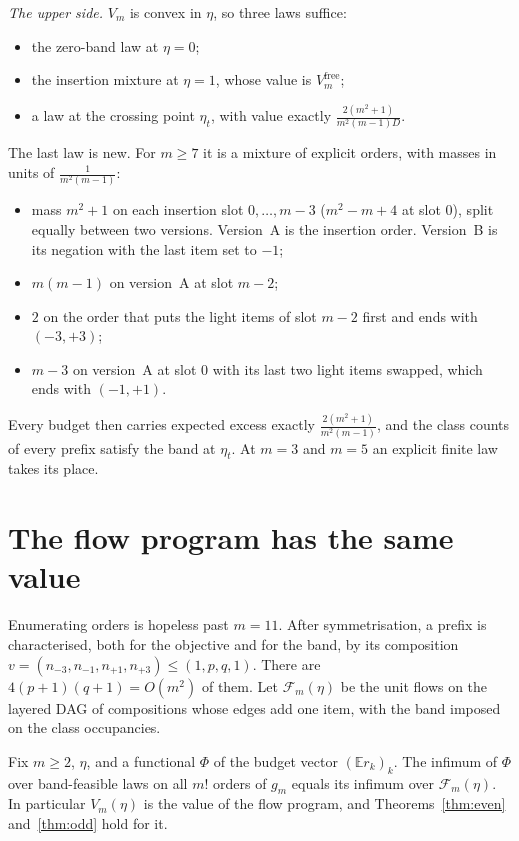 \emph{The upper side.} $V_{m}$ is convex in $\eta$, so three laws suffice:
\begin{itemize}
\item the zero-band law at $\eta=0$;
\item the insertion mixture at $\eta=1$, whose value is $V^{\mathrm{free}}_{m}$;
\item a law at the crossing point $\eta_{t}$, with value exactly
$\frac{2(m^{2}+1)}{m^{2}(m-1)D}$.
\end{itemize}
The last law is new. For $m\ge7$ it is a mixture of explicit orders, with masses in units of
$\frac{1}{m^{2}(m-1)}$:
\begin{itemize}
\item mass $m^{2}+1$ on each insertion slot $0,\dots,m-3$ ($m^{2}-m+4$ at slot $0$), split
equally between two versions. Version~A is the insertion order. Version~B is its negation
with the last item set to $-1$;
\item $m(m-1)$ on version~A at slot $m-2$;
\item $2$ on the order that puts the light items of slot $m-2$ first and ends with
$(-3,+3)$;
\item $m-3$ on version~A at slot $0$ with its last two light items swapped, which ends with
$(-1,+1)$.
\end{itemize}
Every budget then carries expected excess exactly $\frac{2(m^{2}+1)}{m^{2}(m-1)}$, and the
class counts of every prefix satisfy the band at $\eta_{t}$. At $m=3$ and $m=5$ an explicit
finite law takes its place.

\section{The flow program has the same value}
\label{sec:flow}

Enumerating orders is hopeless past $m=11$. After symmetrisation, a prefix is characterised,
both for the objective and for the band, by its composition
$v=(n_{-3},n_{-1},n_{+1},n_{+3})\le(1,p,q,1)$. There are $4(p+1)(q+1)=O(m^{2})$ of them. Let
$\mathcal{F}_{m}(\eta)$ be the unit flows on the layered DAG of compositions whose edges add
one item, with the band imposed on the class occupancies.

\begin{theorem}
\label{thm:flow}
Fix $m\ge2$, $\eta$, and a functional $\Phi$ of the budget vector $(\mathbb{E}r_{k})_{k}$. The
infimum of $\Phi$ over band-feasible laws on all $m!$ orders of $g_{m}$ equals its infimum
over $\mathcal{F}_{m}(\eta)$. In particular $V_{m}(\eta)$ is the value of the flow program,
and Theorems~\ref{thm:even} and~\ref{thm:odd} hold for it.
\end{theorem}

